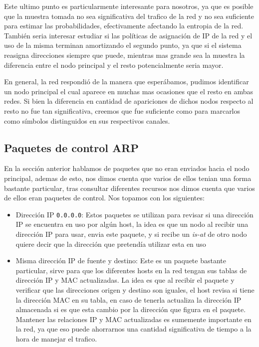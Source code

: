 Este ultimo punto es particularmente interesante para nosotros, ya que es posible que la muestra tomada no sea significativa del trafico de la red y no sea suficiente para estimar las probabilidades, efectivamente afectando la entropia de la red. También seria interesar estudiar si las políticas de asignación de IP de la red y el uso de la misma terminan amortizando el segundo punto, ya que si el sistema reasigna direcciones siempre que puede, mientras mas grande sea la muestra la diferencia entre el nodo principal y el resto potencialmente seria mayor.

En general, la red respondió de la manera que esperábamos, pudimos identificar un nodo principal el cual aparece en muchas mas ocasiones que el resto en ambas redes. Si bien la diferencia en cantidad de apariciones de dichos nodos respecto al resto no fue tan significativa, creemos que fue suficiente como para marcarlos como símbolos distinguidos en sus respectivos canales.

\subsection{Paquetes de control ARP}

En la sección anterior hablamos de paquetes que no eran enviados hacia el nodo principal, ademas de esto, nos dimos cuenta que varios de ellos tenian una forma bastante particular, tras consultar diferentes recursos nos dimos cuenta que varios de ellos eran paquetes de control. Nos topamos con los siguientes:

\begin{itemize}
	\item Dirección IP \texttt{0.0.0.0}: Estos paquetes se utilizan para revisar si una dirección IP se encuentra en uso por algún host, la idea es que un nodo al recibir una dirección IP para usar, envia este paquete, y si recibe un \textit{is-at} de otro nodo quiere decir que la dirección que pretendía utilizar esta en uso
	\item Misma dirección IP de fuente y destino: Este es un paquete bastante particular, sirve para que los diferentes hosts en la red tengan sus tablas de dirección IP y MAC actualizadas. La idea es que al recibir el paquete y verificar que las direcciones origen y destino son iguales, el host revisa si tiene la dirección MAC en su tabla, en caso de tenerla actualiza la dirección IP almacenada si es que esta cambio por la dirección que figura en el paquete. Mantener las relaciones IP y MAC actualizadas es sumemente importante en la red, ya que eso puede ahorrarnos una cantidad significativa de tiempo a la hora de manejar el trafico.
\end{itemize}

